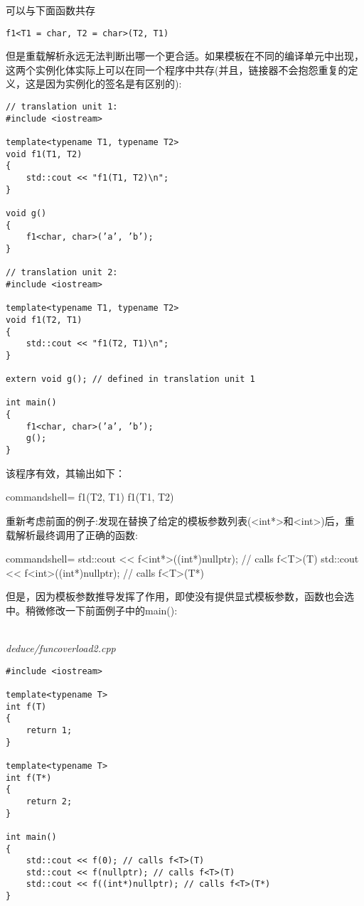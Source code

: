 可以与下面函数共存

\begin{lstlisting}[style=styleCXX]
f1<T1 = char, T2 = char>(T2, T1)
\end{lstlisting}

但是重载解析永远无法判断出哪一个更合适。如果模板在不同的编译单元中出现，这两个实例化体实际上可以在同一个程序中共存(并且，链接器不会抱怨重复的定义，这是因为实例化的签名是有区别的):

\begin{lstlisting}[style=styleCXX]
// translation unit 1:
#include <iostream>

template<typename T1, typename T2>
void f1(T1, T2)
{
	std::cout << "f1(T1, T2)\n";
}

void g()
{
	f1<char, char>(’a’, ’b’);
}

// translation unit 2:
#include <iostream>

template<typename T1, typename T2>
void f1(T2, T1)
{
	std::cout << "f1(T2, T1)\n";
}

extern void g(); // defined in translation unit 1

int main()
{
	f1<char, char>(’a’, ’b’);
	g();
}
\end{lstlisting}

该程序有效，其输出如下：

\begin{tcblisting}{commandshell={}}
f1(T2, T1)
f1(T1, T2)
\end{tcblisting}


重新考虑前面的例子:发现在替换了给定的模板参数列表(<int*>和<int>)后，重载解析最终调用了正确的函数:

\begin{tcblisting}{commandshell={}}
std::cout << f<int*>((int*)nullptr); // calls f<T>(T)
std::cout << f<int>((int*)nullptr); // calls f<T>(T*)
\end{tcblisting}

但是，因为模板参数推导发挥了作用，即使没有提供显式模板参数，函数也会选中。稍微修改一下前面例子中的main():

\hspace*{\fill} \\ %
\noindent
\textit{deduce/funcoverload2.cpp}
\begin{lstlisting}[style=styleCXX]
#include <iostream>

template<typename T>
int f(T)
{
	return 1;
}

template<typename T>
int f(T*)
{
	return 2;
}

int main()
{
	std::cout << f(0); // calls f<T>(T)
	std::cout << f(nullptr); // calls f<T>(T)
	std::cout << f((int*)nullptr); // calls f<T>(T*)
}
\end{lstlisting}


